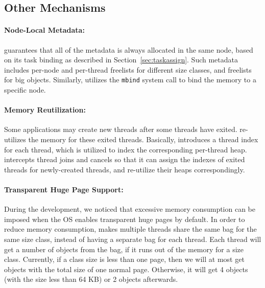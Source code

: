 \subsection{Other Mechanisms}
\label{sec: others}

\paragraph{Node-Local Metadata:} \NM{} guarantees that all of the metadata is always allocated in the same node, based on its task binding as described in Section~\ref{sec:taskassign}. Such metadata includes per-node and per-thread freelists for different size classes, and freelists for big objects. Similarly, \NM{} utilizes the \texttt{mbind} system call to bind the memory to a specific node.  

\paragraph{Memory Reutilization:} Some applications may create new threads after some threads have exited. \NM{} re-utilizes the memory for these exited threads. Basically, \NM{} introduces a thread index for each thread, which is utilized to index the corresponding per-thread heap.  \NM{} intercepts thread joins and cancels so that it can assign the indexes of exited threads for newly-created threads, and re-utilize their heaps correspondingly.  


\paragraph{Transparent Huge Page Support:} During the development, we noticed that excessive memory consumption can be imposed when the OS enables transparent huge pages by default. In order to reduce memory consumption, \NM{} makes multiple threads share the same bag for the same size class, instead of having a separate bag for each thread. Each thread will get a number of objects from the bag, if it runs out of the memory for a size class. Currently, if a class size is less than one page, then we will at most get objects with the total size of one normal page. Otherwise, it will get 4 objects (with the size less than 64 KB) or 2 objects afterwards.  


 

